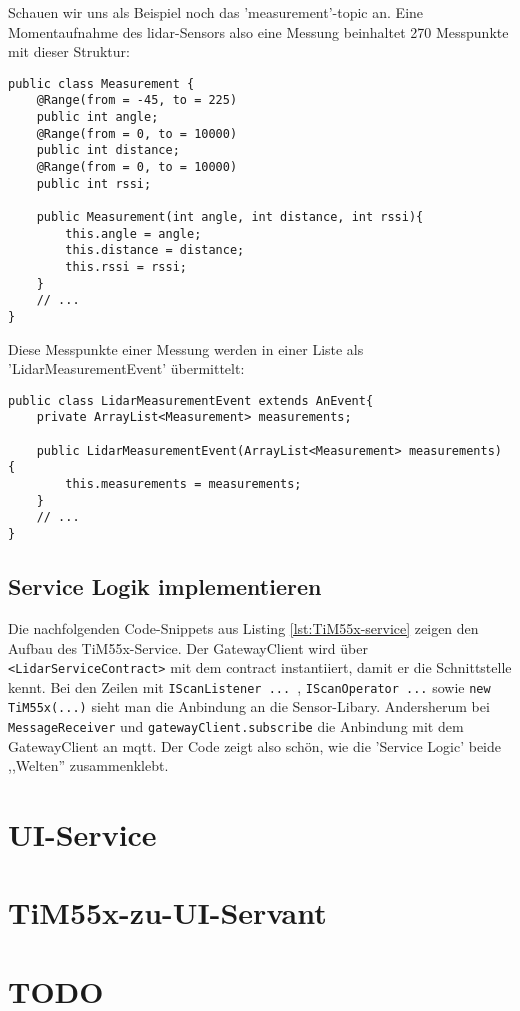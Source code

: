 Schauen wir uns als Beispiel noch das 'measurement'-\Gls{topic} an. Eine Momentaufnahme des \acrshort{lidar}-Sensors also eine Messung beinhaltet 270 Messpunkte mit dieser Struktur:
\begin{lstlisting}[caption={TiM55x-Service - Struktur der Messpunkte},label={lst:lidar_measurement}]
public class Measurement {
	@Range(from = -45, to = 225)
	public int angle;
	@Range(from = 0, to = 10000)
	public int distance;
	@Range(from = 0, to = 10000)
	public int rssi;
	
	public Measurement(int angle, int distance, int rssi){
		this.angle = angle;
		this.distance = distance;
		this.rssi = rssi;
	}
	// ...
}
\end{lstlisting}
Diese Messpunkte einer Messung werden in einer Liste als 'LidarMeasurementEvent' übermittelt:
\begin{lstlisting}[caption={TiM55x-Service - Struktur des 'LidarMeasurementEvent'},label={lst:lidar_measurementevent}]
public class LidarMeasurementEvent extends AnEvent{
	private ArrayList<Measurement> measurements;
	
	public LidarMeasurementEvent(ArrayList<Measurement> measurements) {
		this.measurements = measurements;
	}
	// ...
}
\end{lstlisting}

\subsection{Service Logik implementieren}
Die nachfolgenden Code-Snippets aus Listing \ref{lst:TiM55x-service} zeigen den Aufbau des TiM55x-Service. Der GatewayClient wird über \verb|<LidarServiceContract>| mit dem \Gls{contract} instantiiert, damit er die Schnittstelle kennt. Bei den Zeilen mit \verb|IScanListener ... |, \verb|IScanOperator ...| sowie \verb|new TiM55x(...)| sieht man die Anbindung an die Sensor-Libary. Andersherum bei \verb|MessageReceiver| und \verb|gatewayClient.subscribe| die Anbindung mit dem GatewayClient an \acrshort{mqtt}. Der Code zeigt also schön, wie die 'Service Logic' beide ,,Welten'' zusammenklebt.



\section{UI-Service}

\section{TiM55x-zu-UI-Servant}

\section{TODO}

